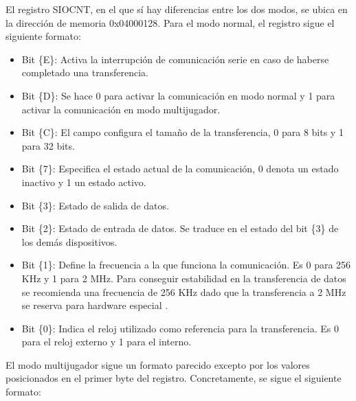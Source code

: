 El registro SIOCNT, en el que sí hay diferencias entre los dos modos, se ubica en la dirección de memoria 0x04000128. Para el modo normal, el registro sigue el siguiente formato:

\begin{itemize}
	\item Bit \{E\}: Activa la interrupción de comunicación serie en caso de haberse completado una transferencia.
	\item Bit \{D\}: Se hace 0 para activar la comunicación en modo normal y 1 para activar la comunicación en modo multijugador.
	\item Bit \{C\}: El campo configura el tamaño de la transferencia, 0 para 8 bits y 1 para 32 bits.
	\item Bit \{7\}: Especifica el estado actual de la comunicación, 0 denota un estado inactivo y 1 un estado activo.
	\item Bit \{3\}: Estado de salida de datos.
	\item Bit \{2\}: Estado de entrada de datos. Se traduce en el estado del bit \{3\} de los demás dispositivos.
	\item Bit \{1\}: Define la frecuencia a la que funciona la comunicación. Es 0 para 256 KHz y 1 para 2 MHz. Para conseguir estabilidad en la transferencia de datos se recomienda una frecuencia de 256 KHz dado que la transferencia a 2 MHz se reserva para hardware especial \cite{bib:gbatek}.
	\item Bit \{0\}: Indica el reloj utilizado como referencia para la transferencia. Es 0 para el reloj externo y 1 para el interno.
\end{itemize}

El modo multijugador sigue un formato parecido excepto por los valores posicionados en el primer byte del registro. Concretamente, se sigue el siguiente formato:

